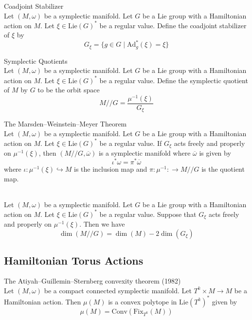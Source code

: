 \documentclass[a4paper]{article}
\begin{document}
\begin{defn}{Coadjoint Stabilizer}{}\\
Let $(M,\omega)$ be a symplectic manifold. Let $G$ be a Lie group with a Hamiltonian action on $M$. Let $\xi\in\text{Lie}(G)^\ast$ be a regular value. Define the coadjoint stabilizer of $\xi$ by $$G_\xi=\{g\in G\;|\;\text{Ad}_g^\ast(\xi)=\xi\}$$
\end{defn}

\begin{defn}{Symplectic Quotients}{}\\
Let $(M,\omega)$ be a symplectic manifold. Let $G$ be a Lie group with a Hamiltonian action on $M$. Let $\xi\in\text{Lie}(G)^\ast$ be a regular value. Define the symplectic quotient of $M$ by $G$ to be the orbit space $$M//G=\frac{\mu^{-1}(\xi)}{G_\xi}$$
\end{defn}

\begin{thm}{The Marsden–Weinstein–Meyer Theorem}{}\\
Let $(M,\omega)$ be a symplectic manifold. Let $G$ be a Lie group with a Hamiltonian action on $M$. Let $\xi\in\text{Lie}(G)^\ast$ be a regular value. If $G_\xi$ acts freely and properly on $\mu^{-1}(\xi)$, then $(M//G,\overline{\omega})$ is a symplectic manifold where $\overline{\omega}$ is given by $$\iota^\ast\omega=\pi^\ast\overline{\omega}$$ where $\iota:\mu^{-1}(\xi)\hookrightarrow M$ is the inclusion map and $\pi:\mu^{-1}:\to M//G$ is the quotient map. 
\end{thm}

\begin{prp}{}{}\\
Let $(M,\omega)$ be a symplectic manifold. Let $G$ be a Lie group with a Hamiltonian action on $M$. Let $\xi\in\text{Lie}(G)^\ast$ be a regular value. Suppose that $G_\xi$ acts freely and properly on $\mu^{-1}(\xi)$. Then we have $$\dim(M//G)=\dim(M)-2\dim(G_\xi)$$
\end{prp}

\subsection{Hamiltonian Torus Actions}
\begin{thm}{The Atiyah–Guillemin–Sternberg convexity theorem (1982)}{}\\
Let $(M,\omega)$ be a compact connected symplectic manifold. Let $T^k\times M\to M$ be a Hamiltonian action. Then $\mu(M)$ is a convex polytope in $\text{Lie}(T^k)^\ast$ given by $$\mu(M)=\text{Conv}(\text{Fix}_{T^k}(M))$$
\end{thm}
\end{document}
